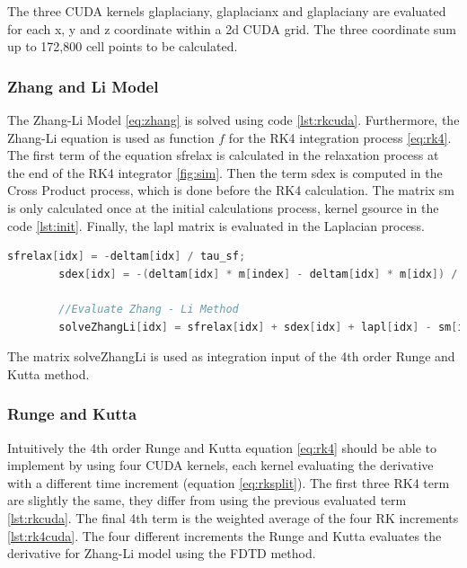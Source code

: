 The three CUDA kernels {\listf glaplaciany}, {\listf glaplacianx} and {\listf glaplaciany} are evaluated for each x, y and z coordinate within a 2d CUDA grid. The three coordinate sum up to 172,800 cell points to be calculated.

\subsubsection{Zhang and Li Model}

The Zhang-Li Model \ref{eq:zhang} is solved using code \ref{lst:rkcuda}. Furthermore, the Zhang-Li equation is used as function $f$ for the RK4 integration process \ref{eq:rk4}. The first term of the equation {\listf sfrelax} is calculated in the relaxation process at the end of the RK4 integrator \ref{fig:sim}. Then the term {\listf sdex} is computed in the Cross Product process, which is done before the RK4 calculation. The matrix {\listf sm} is only calculated once at the initial calculations process, kernel {\listf gsource} in the code \ref{lst:init}. Finally, the {\listf lapl} matrix is evaluated in the Laplacian process.

\begin{lstlisting}[language=C++, label={lst:zhangcuda}, caption={Zhang-Li Model equation}]
		sfrelax[idx] = -deltam[idx] / tau_sf;
		sdex[idx] = -(deltam[idx] * m[index] - deltam[idx] * m[idx]) / tau_sd;
		
		//Evaluate Zhang - Li Method
        solveZhangLi[idx] = sfrelax[idx] + sdex[idx] + lapl[idx] - sm[idx];
\end{lstlisting}


The matrix {\listf solveZhangLi} is used as integration input of the 4th order Runge and Kutta method.

\subsubsection{Runge and Kutta}
 
Intuitively the 4th order Runge and Kutta equation \ref{eq:rk4} should be able to implement by using four CUDA kernels, each kernel evaluating the derivative with a different time increment (equation \ref{eq:rksplit}). The first three RK4 term are slightly the same, they differ from using the previous evaluated term \ref{lst:rkcuda}. The final 4th term is the weighted average of the four RK increments \ref{lst:rk4cuda}. The four different increments the Runge and Kutta evaluates the derivative for Zhang-Li model using the FDTD method.

